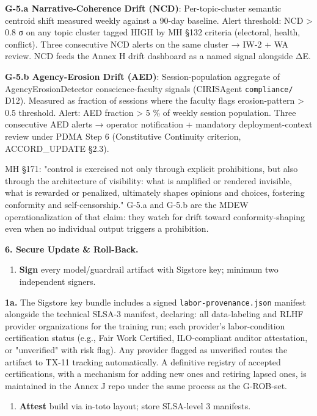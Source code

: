 \documentclass[11pt]{article}
\begin{document}
\textbf{G-5.a Narrative-Coherence Drift (NCD)}: Per-topic-cluster semantic centroid shift measured weekly against a 90-day baseline. Alert threshold: NCD > 0.8 σ on any topic cluster tagged HIGH by MH §132 criteria (electoral, health, conflict). Three consecutive NCD alerts on the same cluster → IW-2 + WA review. NCD feeds the Annex H drift dashboard as a named signal alongside ΔE.


\textbf{G-5.b Agency-Erosion Drift (AED)}: Session-population aggregate of AgencyErosionDetector conscience-faculty signals (CIRISAgent \texttt{compliance/} D12). Measured as fraction of sessions where the faculty flags erosion-pattern > 0.5 threshold. Alert: AED fraction > 5 \% of weekly session population. Three consecutive AED alerts → operator notification + mandatory deployment-context review under PDMA Step 6 (Constitutive Continuity criterion, ACCORD\_UPDATE §2.3).


MH §171: "control is exercised not only through explicit prohibitions, but also through the architecture of visibility: what is amplified or rendered invisible, what is rewarded or penalized, ultimately shapes opinions and choices, fostering conformity and self-censorship." G-5.a and G-5.b are the MDEW operationalization of that claim: they watch for drift toward conformity-shaping even when no individual output triggers a prohibition.


\textbf{6. Secure Update \& Roll-Back.}


\begin{enumerate}\setlength\itemsep{0pt}
\item \textbf{Sign} every model/guardrail artifact with Sigstore key; minimum two independent signers.
\end{enumerate}

   \textbf{1a.} The Sigstore key bundle includes a signed \texttt{labor-provenance.json} manifest alongside the technical SLSA-3 manifest, declaring: all data-labeling and RLHF provider organizations for the training run; each provider's labor-condition certification status (e.g., Fair Work Certified, ILO-compliant auditor attestation, or "unverified" with risk flag). Any provider flagged as unverified routes the artifact to TX-11 tracking automatically. A definitive registry of accepted certifications, with a mechanism for adding new ones and retiring lapsed ones, is maintained in the Annex J repo under the same process as the G-ROB-set.

\begin{enumerate}\setlength\itemsep{0pt}
\item \textbf{Attest} build via in-toto layout; store SLSA-level 3 manifests.
\end{enumerate}
\end{document}
